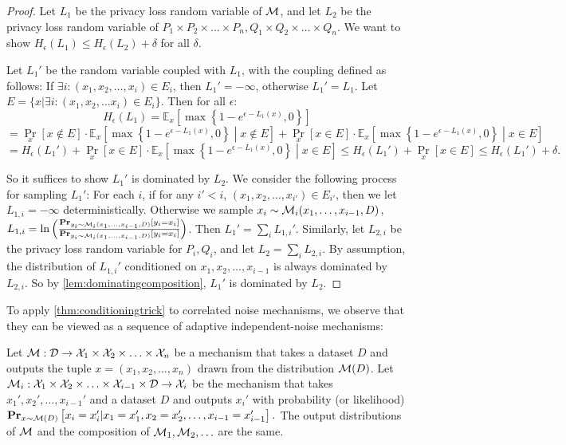 \begin{proof}
Let $L_1$ be the privacy loss random variable of $\mathcal{M}$, and let $L_2$ be the privacy loss random variable of $P_1 \times P_2 \times \ldots \times P_n, Q_1 \times Q_2 \times \ldots \times Q_n$. We want to show $H_\epsilon(L_1) \leq H_\epsilon(L_2) + \delta$ for all $\delta$.

Let $L_1'$ be the random variable coupled with $L_1$, with the coupling defined as follows: If $\exists i: (x_1, x_2, \ldots, x_i) \in E_i$, then $L_1' = -\infty$, otherwise $L_1' = L_1$. Let $E = \{x | \exists i: (x_1, x_2, \ldots x_i) \in E_i\}$. Then for all $\epsilon$:
\[H_\epsilon(L_1) = \mathbb{E}_{x}\left[\max\left\{1-e^{\epsilon - L_1(x)}, 0\right\}\right]\]
\[= \Pr_x[x \notin E] \cdot \mathbb{E}_{x}\left[\max\left\{1-e^{\epsilon - L_1(x)}, 0\right\} \middle| x \notin E\right] + \Pr_x[x \in E] \cdot \mathbb{E}_{x}\left[\max\left\{1-e^{\epsilon - L_1(x)}, 0\right\} \middle| x \in E\right]\]
\[=H_\epsilon(L_1') + \Pr_x[x \in E] \cdot \mathbb{E}_{x}\left[\max\left\{1-e^{\epsilon - L_1(x)}, 0\right\} \middle| x \in E\right] \leq H_\epsilon(L_1') + \Pr_x[x \in E] \leq H_\epsilon(L_1') + \delta.\]

So it suffices to show $L_1'$ is dominated by $L_2$. We consider the following process for sampling $L_1'$: For each $i$, if for any $i' < i$, $(x_1, x_2, \ldots, x_{i'}) \in E_{i'}$, then we let $L_{1,i} = -\infty$ deterministically. Otherwise we sample $x_i \sim \mathcal{M}_i(x_1, \ldots, x_{i-1}, D)$, $L_{1,i} = \ln\left(\frac{\mathop{\mathbf{Pr}}_{y_i \sim \mathcal{M}_i(x_1, \ldots, x_{i-1}, D)}\left[y_i = x_i\right]}{\mathop{\mathbf{Pr}}_{y_i \sim \mathcal{M}_i(x_1, \ldots, x_{i-1}, D)}\left[y_i = x_i\right]}\right)$. Then $L_1' = \sum_i L_{1,i}'$. Similarly, let $L_{2,i}$ be the privacy loss random variable for $P_i, Q_i$, and let $L_2 = \sum_i L_{2,i}$. By assumption, the distribution of $L_{1,i}'$ conditioned on $x_1, x_2, \ldots, x_{i-1}$ is always dominated by $L_{2,i}$. So by \cref{lem:dominatingcomposition}, $L_1'$ is dominated by $L_2$.
\end{proof}
To apply \cref{thm:conditioningtrick} to correlated noise mechanisms, we observe that they can be viewed as a sequence of adaptive independent-noise mechanisms:

\begin{observation}\label{obs:bayesianfaker}
Let $\mathcal{M}: \mathcal{D} \rightarrow \mathcal{X}_1 \times \mathcal{X}_2 \times \ldots \times \mathcal{X}_n$ be a mechanism that takes a dataset $D$ and outputs the tuple $x = (x_1, x_2, \ldots, x_n)$ drawn from the distribution $\mathcal{M}(D)$. Let $\mathcal{M}_i: \mathcal{X}_1 \times \mathcal{X}_2 \times \ldots \times \mathcal{X}_{i-1} \times \mathcal{D} \rightarrow \mathcal{X}_i$ be the mechanism that takes $x_1', x_2', \ldots, x_{i-1}'$ and a dataset $D$ and outputs $x_i'$ with probability (or likelihood) $\mathop{\mathbf{Pr}}_{x \sim \mathcal{M}(D)}\left[x_i = x_i' | x_1 = x_1', x_2 = x_2', \ldots, x_{i-1} = x_{i-1}'\right].$ The output distributions of $\mathcal{M}$ and the composition of $\mathcal{M}_1, \mathcal{M}_2, \ldots$ are the same.
\end{observation}
